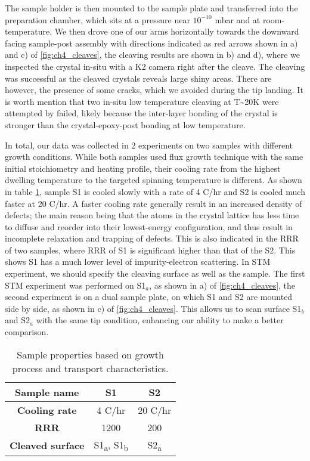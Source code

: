 \par The sample holder is then mounted to the sample plate and transferred into the preparation chamber, which sits at a pressure near $10^{-10}$ mbar and at room-temperature. We then drove one of our arms horizontally towards the downward facing sample-post assembly with directions indicated as red arrows shown in a) and c) of \ref{fig:ch4_cleaves}, the cleaving results are shown in b) and d), where we inspected the crystal in-situ with a K2 camera right after the cleave. The cleaving was successful as the cleaved crystals reveals large shiny areas. There are however, the presence of some cracks, which we avoided during the tip landing. It is worth mention that two in-situ low temperature cleaving at T\textasciitilde 20K were attempted by failed, likely because the inter-layer bonding of the crystal is stronger than the crystal-epoxy-post bonding at low temperature.

\par In total, our data was collected in 2 experiments on two samples with different growth conditions. While both samples used flux growth technique with the same initial stoichiometry and heating profile, their cooling rate from the highest dwelling temperature to the targeted spinning temperature is different. As shown in table \ref{table:sample}, sample S1 is cooled slowly with a rate of 4 \degree C/hr and S2 is cooled much faster at 20 \degree C/hr. A faster cooling rate generally result in an increased density of defects; the main reason being that the atoms in the crystal lattice has less time to diffuse and reorder into their lowest-energy configuration, and thus result in incomplete relaxation and trapping of defects. This is also indicated in the \ac{RRR} of two samples, where \ac{RRR} of S1 is significant higher than that of the S2. This shows S1 has a much lower level of impurity-electron scattering.
In \ac{STM} experiment, we should specify the cleaving surface as well as the sample. The first \ac{STM} experiment was performed on S1$_a$, as shown in a) of \ref{fig:ch4_cleaves}, the second experiment is on a dual sample plate, on which S1 and S2 are mounted side by side, as shown in c) of \ref{fig:ch4_cleaves}. This allows us to scan surface S1$_b$ and S2$_a$ with the same tip condition, enhancing our ability to make a better comparison.

\begin{table}[h!]
	\centering
	\begin{tabular}{|c|c|c|}
		\hline
		\textbf{Sample name} & \textbf{S1} & \textbf{S2} \\ \hline
		\textbf{Cooling rate} & 4 \degree C/hr & 20 \degree C/hr \\ \hline
		\textbf{\ac{RRR}} & 1200 & 200 \\ \hline
		\textbf{Cleaved surface} & S1\textsubscript{a}, S1\textsubscript{b} & S2\textsubscript{a} \\ \hline
	\end{tabular}
	\caption{Sample properties based on growth process and transport characteristics.}
	\label{table:sample}
\end{table}

